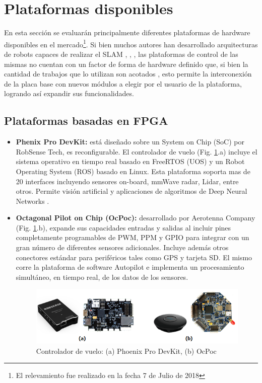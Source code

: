 \section{Plataformas disponibles}
\label{sec:platforms}
En esta sección se evaluarán principalmente diferentes plataformas de hardware disponibles en el mercado\footnote{El relevamiento fue realizado en la fecha 7 de Julio de 2018}. Si bien muchos autores han desarrollado arquitecturas de robots capaces de realizar el SLAM \cite{engel2012}, \cite{engel2014}, \cite{hausman2016}, las plataformas de control de las mismas no cuentan con un factor de forma de hardware definido que, si bien la cantidad de trabajos que lo utilizan son acotados \cite{qi2009}, esto permite la interconexión de la placa base con nuevos módulos a elegir por el usuario de la plataforma, logrando así expandir sus funcionalidades.

\subsection{Plataformas basadas en FPGA}
\begin{itemize}
    \item \textbf{Phenix Pro DevKit:} está diseñado sobre un System on Chip (SoC) por RobSense Tech, es reconfigurable. El controlador de vuelo (Fig. \ref{fig:fpga_based}.a) incluye el sistema operativo en tiempo real basado en FreeRTOS (UOS) y un Robot Operating System (ROS) basado en Linux. Esta plataforma soporta mas de 20 interfaces incluyendo sensores on-board, mmWave radar, Lidar, entre otros. Permite visión artificial y aplicaciones de algoritmos de Deep Neural Networks \cite{shah2017}.
    
    \item \textbf{Octagonal Pilot on Chip (OcPoc):} desarrollado por Aerotenna Company (Fig. \ref{fig:fpga_based}.b), expande sus capacidades entradas y salidas al incluir pines completamente programables de PWM, PPM y GPIO para integrar con un gran número de diferentes sensores adicionales. Incluye además otros conectores estándar para periféricos tales como GPS y tarjeta SD. El mismo corre la plataforma de software Autopilot \cite{autopilot} e implementa un procesamiento simultáneo, en tiempo real, de los datos de los sensores.
    \begin{figure}[!ht]
        \centering
        \includegraphics[width=.95\textwidth]{Img/fpga_based}
        \caption{Controlador de vuelo: (a) Phoenix Pro DevKit, (b) OcPoc}
        \label{fig:fpga_based}
    \end{figure}
\end{itemize}

